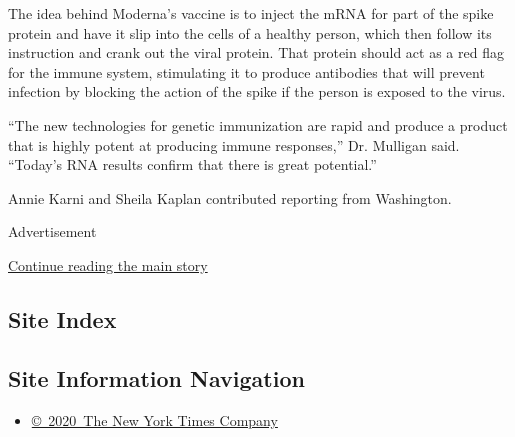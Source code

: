 The idea behind Moderna's vaccine is to inject the mRNA for part of the
spike protein and have it slip into the cells of a healthy person, which
then follow its instruction and crank out the viral protein. That
protein should act as a red flag for the immune system, stimulating it
to produce antibodies that will prevent infection by blocking the action
of the spike if the person is exposed to the virus.

``The new technologies for genetic immunization are rapid and produce a
product that is highly potent at producing immune responses,'' Dr.
Mulligan said. ``Today's RNA results confirm that there is great
potential.''

Annie Karni and Sheila Kaplan contributed reporting from Washington.

Advertisement

\protect\hyperlink{after-bottom}{Continue reading the main story}

\hypertarget{site-index}{%
\subsection{Site Index}\label{site-index}}

\hypertarget{site-information-navigation}{%
\subsection{Site Information
Navigation}\label{site-information-navigation}}

\begin{itemize}
\tightlist
\item
  \href{https://help.nytimes3xbfgragh.onion/hc/en-us/articles/115014792127-Copyright-notice}{©~2020~The
  New York Times Company}
\end{itemize}

